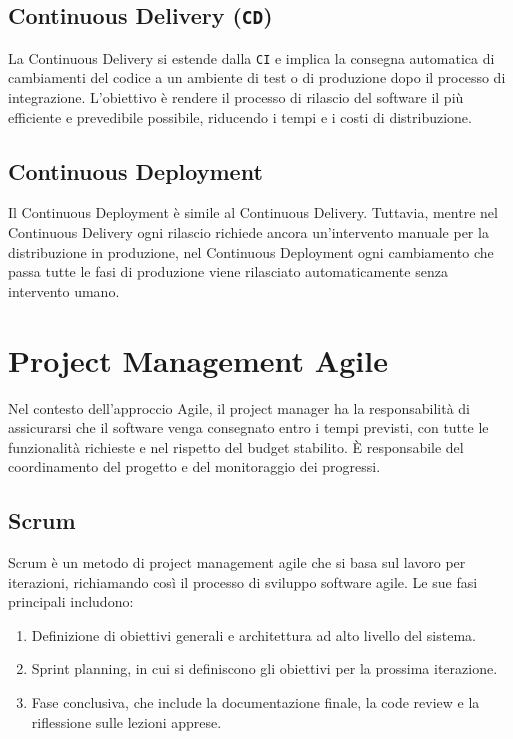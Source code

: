 \subsection{Continuous Delivery (\texttt{CD})}
La Continuous Delivery si estende dalla \texttt{CI} e implica la consegna automatica di cambiamenti del codice a un ambiente di test o di produzione dopo il
processo di integrazione. L'obiettivo è rendere il processo di rilascio del software il più efficiente e prevedibile possibile, riducendo i tempi
e i costi di distribuzione.

\subsection{Continuous Deployment}
Il Continuous Deployment è simile al Continuous Delivery. Tuttavia, mentre nel Continuous Delivery ogni rilascio richiede ancora un'intervento
manuale per la distribuzione in produzione, nel Continuous Deployment ogni cambiamento che passa tutte le fasi di produzione viene rilasciato
automaticamente senza intervento umano.

\section{Project Management Agile}
Nel contesto dell'approccio Agile, il project manager ha la responsabilità di assicurarsi che il software venga consegnato entro i tempi
previsti, con tutte le funzionalità richieste e nel rispetto del budget stabilito. È responsabile del coordinamento del progetto e del
monitoraggio dei progressi.

\subsection{Scrum}
Scrum è un metodo di project management agile che si basa sul lavoro per iterazioni, richiamando così il processo di sviluppo software agile.
Le sue fasi principali includono:

\begin{enumerate}
    \item Definizione di obiettivi generali e architettura ad alto livello del sistema.
    \item Sprint planning, in cui si definiscono gli obiettivi per la prossima iterazione.
    \item Fase conclusiva, che include la documentazione finale, la code review e la riflessione sulle lezioni apprese.
\end{enumerate}

